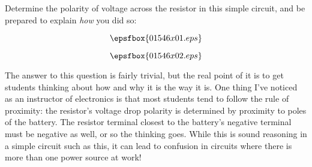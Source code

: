 

Determine the polarity of voltage across the resistor in this simple circuit, and be prepared to explain {\it how} you did so:

$$\epsfbox{01546x01.eps}$$







$$\epsfbox{01546x02.eps}$$







The answer to this question is fairly trivial, but the real point of it is to get students thinking about how and why it is the way it is.  One thing I've noticed as an instructor of electronics is that most students tend to follow the rule of proximity: the resistor's voltage drop polarity is determined by proximity to poles of the battery.  The resistor terminal closest to the battery's negative terminal must be negative as well, or so the thinking goes.  While this is sound reasoning in a simple circuit such as this, it can lead to confusion in circuits where there is more than one power source at work!




